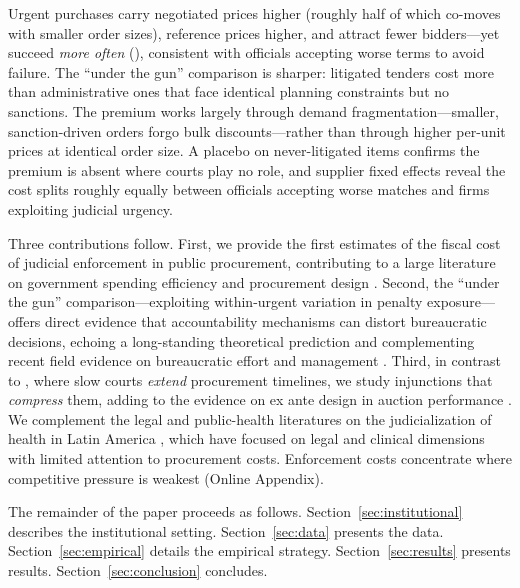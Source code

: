 Urgent purchases carry negotiated prices \BPnegPctHeadline{} higher (roughly half of which co-moves with smaller order sizes), reference prices \BPrefPctPreferred{} higher, and attract \BPfirmsPctHeadline{} fewer bidders---yet succeed \textit{more often} (\BPsuccessPP), consistent with officials accepting worse terms to avoid failure. The ``under the gun'' comparison is sharper: litigated tenders cost \BPutgPctRange{} more than administrative ones that face identical planning constraints but no sanctions. The premium works largely through demand fragmentation---smaller, sanction-driven orders forgo bulk discounts---rather than through higher per-unit prices at identical order size. A placebo on never-litigated items confirms the premium is absent where courts play no role, and supplier fixed effects reveal the cost splits roughly equally between officials accepting worse matches and firms exploiting judicial urgency.

Three contributions follow. First, we provide the first estimates of the fiscal cost of judicial enforcement in public procurement, contributing to a large literature on government spending efficiency and procurement design \citep{bandiera2009active, best2023procurement, decarolis2018buyer, lewisfaupel2016can, szucs2024discretion}. Second, the ``under the gun'' comparison---exploiting within-urgent variation in penalty exposure---offers direct evidence that accountability mechanisms can distort bureaucratic decisions, echoing a long-standing theoretical prediction \citep{prendergast2007bureaucrats} and complementing recent field evidence on bureaucratic effort and management \citep{rasul2018management, williams2021bureaucratic}. Third, in contrast to \citet{coviello2018court}, where slow courts \emph{extend} procurement timelines, we study injunctions that \emph{compress} them, adding to the evidence on ex ante design in auction performance \citep{coviello2018bidding, baltrunaite2021discretion}. We complement the legal and public-health literatures on the judicialization of health in Latin America \citep{wang2015right, ferraz2009right, biehl2009will}, which have focused on legal and clinical dimensions with limited attention to procurement costs. Enforcement costs concentrate where competitive pressure is weakest (Online Appendix).

The remainder of the paper proceeds as follows. Section~\ref{sec:institutional} describes the institutional setting. Section~\ref{sec:data} presents the data. Section~\ref{sec:empirical} details the empirical strategy. Section~\ref{sec:results} presents results. Section~\ref{sec:conclusion} concludes.
